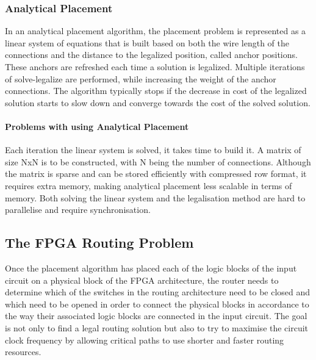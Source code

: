 \documentclass[a4paper,oneside,12pt]{article}
\begin{document}
\subsubsection{Analytical Placement}
In an analytical placement algorithm, the placement problem is represented as a linear system of equations that is built based on both the wire length of the connections and the distance to the legalized position, called anchor positions. These anchors are refreshed each time a solution is legalized.
Multiple iterations of solve-legalize are performed, while increasing the weight of the anchor connections. The algorithm typically stops if the decrease in cost of the legalized solution starts to slow down and converge towards the cost of the solved solution.  %

\paragraph{Problems with using Analytical Placement}
Each iteration the linear system is solved, it takes time to build it. A matrix of size NxN is to be constructed, with N being the number of connections. Although the matrix is sparse and can be stored efficiently with compressed row format, it requires extra memory, making analytical placement less scalable in terms of memory.
Both solving the linear system and the legalisation method are hard to parallelise and require synchronisation.

\subsection{The FPGA Routing Problem}
Once the placement algorithm has placed each of the logic blocks of the input circuit on a physical block of the FPGA architecture, the router needs to determine which of the switches in the routing architecture need to be closed and which need to be opened in order to connect the physical blocks in accordance to the way their associated logic blocks are connected in the input circuit. The goal is not only to find a legal routing solution but also to try to maximise the circuit clock frequency by allowing critical paths to use shorter and faster routing resources.
\end{document}
